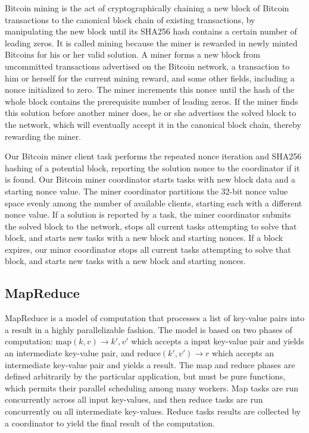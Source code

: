\documentclass [11pt, twocolumn] {article}
\begin{document}
Bitcoin mining is the act of cryptographically chaining a new block of Bitcoin transactions to the canonical block chain of existing transactions, by manipulating the new block until its SHA256 hash contains a certain number of leading zeros. It is called mining because the miner is rewarded in newly minted Bitcoins for his or her valid solution. A miner forms a new block from uncommitted transactions advertised on the Bitcoin network, a transaction to him or herself for the current mining reward, and some other fields, including a nonce initialized to zero. The miner increments this nonce until the hash of the whole block contains the prerequisite number of leading zeros. If the miner finds this solution before another miner does, he or she advertises the solved block to the network, which will eventually accept it in the canonical block chain, thereby rewarding the miner.

Our Bitcoin miner client task performs the repeated nonce iteration and SHA256 hashing of a potential block, reporting the solution nonce to the coordinator if it is found. Our Bitcoin miner coordinator starts tasks with new block data and a starting nonce value. The miner coordinator partitions the 32-bit nonce value space evenly among the number of available clients, starting each with a different nonce value. If a solution is reported by a task, the miner coordinator submits the solved block to the network, stops all current tasks attempting to solve that block, and starts new tasks with a new block and starting nonces. If a block expires, our minor coordinator stops all current tasks attempting to solve that block, and starts new tasks with a new block and starting nonces.

\subsection {MapReduce} 

MapReduce is a model of computation that processes a list of key-value pairs into a result in a highly parallelizable fashion. The model is based on two phases of computation: $\text{map}(k, v) \rightarrow k',v'$ which accepts a input key-value pair and yields an intermediate key-value pair, and $\text{reduce}(k', v') \rightarrow r$ which accepts an intermediate key-value pair and yields a result. The map and reduce phases are defined arbitrarily by the particular application, but must be pure functions, which permits their parallel scheduling among many workers. Map tasks are run concurrently across all input key-values, and then reduce tasks are run concurrently on all intermediate key-values. Reduce tasks results are collected by a coordinator to yield the final result of the computation.
\end{document}

